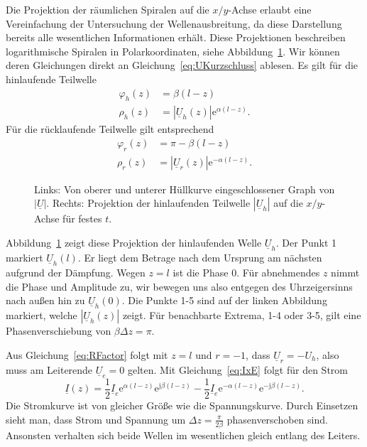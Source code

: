 \documentclass[paper=a4, parskip=half-, ngerman, fontsize=11pt]{scrreprt}
\begin{document}
Die Projektion der räumlichen Spiralen auf die $x/y$-Achse erlaubt eine Vereinfachung der Untersuchung der
Wellenausbreitung, da diese Darstellung bereits alle wesentlichen Informationen erhält. Diese Projektionen beschreiben
logarithmische Spiralen in Polarkoordinaten, siehe Abbildung~\ref{Spirale}.
Wir können deren Gleichungen direkt an Gleichung~\eqref{eq:UKurzschluss} ablesen. Es gilt für die hinlaufende Teilwelle
\begin{align}
    \varphi_{h}(z) &= \beta (l - z) \\[1ex]
    \rho_{h}(z) &= \left| \underline{U}_{h}(z) \right| \mathrm{e}^{\alpha (l - z)}.
\end{align}
Für die rücklaufende Teilwelle gilt entsprechend
\begin{align}
    \varphi_{r}(z) &= \pi - \beta (l - z) \\[1ex]
    \rho_{r}(z) &= \left| \underline{U}_{r}(z) \right| \mathrm{e}^{- \alpha (l - z)}.
\end{align}

\begin{figure}[!htb]
    \begin{subfigure}[b]{0.49\textwidth}
        \centering
        
    \end{subfigure}%
    \hfill
    \begin{subfigure}[b]{0.4\textwidth}
        \centering
        
    \end{subfigure}
    \caption{Links: Von oberer und unterer Hüllkurve eingeschlossener Graph von $\left| \underline{U} \right|$. Rechts:
    Projektion der hinlaufenden Teilwelle $\left| \underline{U}_h \right|$ auf die $x/y$-Achse für festes $t$.}
    \label{Spirale}
\end{figure}
Abbildung~\ref{Spirale} zeigt diese Projektion der hinlaufenden Welle $\underline{U}_{h}$. Der Punkt 1 markiert
$\underline{U}_{h}(l)$. Er liegt dem Betrage nach dem Ursprung am nächsten aufgrund der Dämpfung. Wegen $z=l$ ist die
Phase 0. Für abnehmendes $z$ nimmt die Phase und Amplitude zu, wir bewegen uns also entgegen des Uhrzeigersinns nach
außen hin zu $\underline{U}_{h}(0)$. Die Punkte 1-5 sind auf der linken Abbildung markiert, welche
$|\underline{U}_{h}(z)|$ zeigt. Für benachbarte Extrema, 1-4 oder 3-5, gilt eine Phasenverschiebung von $\beta \Delta z
= \pi$.

Aus Gleichung~\eqref{eq:RFactor} folgt mit $z=l$ und $r=-1$, dass $\underline{U}_{r} = - U_{h}$, also muss am
Leiterende $\underline{U}_{e} = 0$ gelten. Mit Gleichung~\eqref{eq:IxE} folgt für den Strom
\[
\underline{I}(z) =
\frac{1}{2} \underline{I}_{e} \mathrm{e}^{\alpha (l - z)} \mathrm{e}^{\mathrm{j} \beta (l - z)}
-
\frac{1}{2} \underline{I}_{e} \mathrm{e}^{- \alpha (l - z)} \mathrm{e}^{- \mathrm{j} \beta (l - z)}.
\]
Die Stromkurve ist von gleicher Größe wie die Spannungskurve. Durch Einsetzen sieht man, dass Strom und Spannung um
$\Delta z = \frac{\pi}{2 \beta}$ phasenverschoben sind. Ansonsten verhalten sich beide Wellen im wesentlichen gleich
entlang des Leiters.
\end{document}

